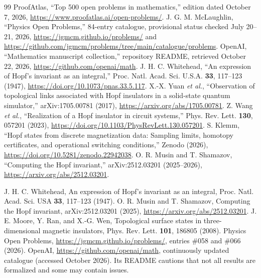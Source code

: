 \documentclass[aps,prd,onecolumn,notitlepage,11pt,superscriptaddress,longbibliography]{revtex4-2}
\begin{document}
\begin{thebibliography}{99}
 ProofAtlas, ``Top 500 open problems in mathematics,'' edition dated October 7, 2026, \url{https://www.proofatlas.ai/open-problems/}.
 J. G. M. McLaughlin, ``Physics Open Problems,'' 84-entry catalogue, provisional status checked July 20--21, 2026, \url{https://jgmcm.github.io/problems/} and \url{https://github.com/jgmcm/problems/tree/main/catalogue/problems}.
 OpenAI, ``Mathematics manuscript collection,'' repository README, retrieved October 22, 2026, \url{https://github.com/openai/math}.
 J. H. C. Whitehead, ``An expression of Hopf's invariant as an integral,'' Proc. Natl. Acad. Sci. U.S.A. \textbf{33}, 117--123 (1947), \url{https://doi.org/10.1073/pnas.33.5.117}.
 X.-X. Yuan \emph{et al.}, ``Observation of topological links associated with Hopf insulators in a solid-state quantum simulator,'' arXiv:1705.00781 (2017), \url{https://arxiv.org/abs/1705.00781}.
 Z. Wang \emph{et al.}, ``Realization of a Hopf insulator in circuit systems,'' Phys. Rev. Lett. \textbf{130}, 057201 (2023), \url{https://doi.org/10.1103/PhysRevLett.130.057201}.
 S. Klemm, ``Hopf states from discrete magnetization data: Sampling limits, homotopy certificates, and operational switching conditions,'' Zenodo (2026), \url{https://doi.org/10.5281/zenodo.22942038}.
 O. R. Musin and T. Shamazov, ``Computing the Hopf invariant,'' arXiv:2512.03201 (2025--2026), \url{https://arxiv.org/abs/2512.03201}.

 J. H. C. Whitehead, An expression of Hopf's invariant as an integral, Proc. Natl. Acad. Sci. USA \textbf{33}, 117--123 (1947).
 O. R. Musin and T. Shamazov, Computing the Hopf invariant, arXiv:2512.03201 (2025), \url{https://arxiv.org/abs/2512.03201}.
 J. E. Moore, Y. Ran, and X.-G. Wen, Topological surface states in three-dimensional magnetic insulators, Phys. Rev. Lett. \textbf{101}, 186805 (2008).
 Physics Open Problems, \url{https://jgmcm.github.io/problems/}, entries \#058 and \#066 (2026).
 OpenAI, \url{https://github.com/openai/math}, continuously updated catalogue (accessed October 2026). Its README cautions that not all results are formalized and some may contain issues.


\end{thebibliography}
\end{document}
